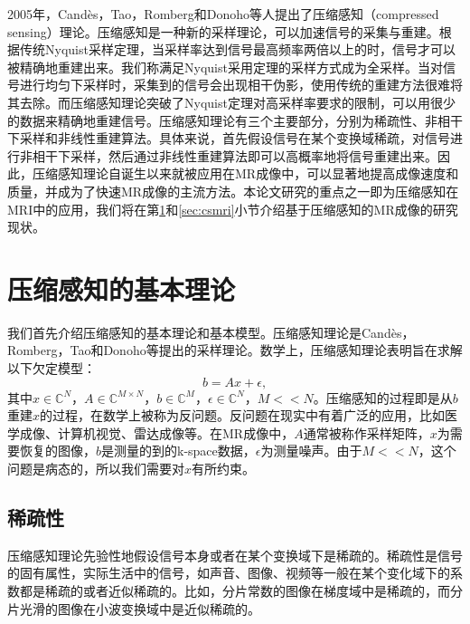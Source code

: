 2005年，Candès，Tao，Romberg\cite{candes2004near,candes2006compressive,candes2006quantitative,candes2006stable}和Donoho\cite{Donoho2006Compressed}等人提出了压缩感知（compressed sensing）理论。压缩感知是一种新的采样理论，可以加速信号的采集与重建。根据传统Nyquist采样定理\cite{Nyquist}，当采样率达到信号最高频率两倍以上的时，信号才可以被精确地重建出来。我们称满足Nyquist采用定理的采样方式成为全采样。当对信号进行均匀下采样时，采集到的信号会出现相干伪影，使用传统的重建方法很难将其去除。而压缩感知理论突破了Nyquist定理对高采样率要求的限制，可以用很少的数据来精确地重建信号。压缩感知理论有三个主要部分，分别为稀疏性、非相干下采样和非线性重建算法。具体来说，首先假设信号在某个变换域稀疏，对信号进行非相干下采样，然后通过非线性重建算法即可以高概率地将信号重建出来。因此，压缩感知理论自诞生以来就被应用在MR成像中，可以显著地提高成像速度和质量，并成为了快速MR成像的主流方法。本论文研究的重点之一即为压缩感知在MRI中的应用，我们将在第\ref{sec:cs}和\ref{sec:csmri}小节介绍基于压缩感知的MR成像的研究现状。

\section{压缩感知的基本理论}
\label{sec:cs}
我们首先介绍压缩感知的基本理论和基本模型。压缩感知理论是Candès，Romberg，Tao\cite{candes2004near,candes2006compressive,candes2006quantitative,candes2006stable}和Donoho\cite{Donoho2006Compressed}等提出的采样理论。数学上，压缩感知理论表明旨在求解以下欠定模型：
\begin{equation}
	b=Ax+\epsilon,
	\label{equ:cs}
\end{equation}
其中$x\in \mathbb{C}^N$，$A\in \mathbb{C}^{M\times N}$，$b\in \mathbb{C}^M$，$\epsilon\in \mathbb{C}^N$，$M<<N$。压缩感知的过程即是从$b$重建$x$的过程，在数学上被称为反问题。反问题在现实中有着广泛的应用，比如医学成像\cite{golbabaee2012hyperspectral,quinsac2010compressed,xu2012low,lustig2006}、计算机视觉\cite{wright2008robust}、雷达成像\cite{choi2010compressed}等。在MR成像中，$A$通常被称作采样矩阵，$x$为需要恢复的图像，$b$是测量的到的k-space数据，$\epsilon$为测量噪声。由于$M<<N$，这个问题是病态的，所以我们需要对$x$有所约束。

\subsection{稀疏性}
压缩感知理论先验性地假设信号本身或者在某个变换域下是稀疏的。稀疏性是信号的固有属性，实际生活中的信号，如声音、图像、视频等一般在某个变化域下的系数都是稀疏的或者近似稀疏的。比如，分片常数的图像在梯度域中是稀疏的，而分片光滑的图像在小波变换域中是近似稀疏的。


